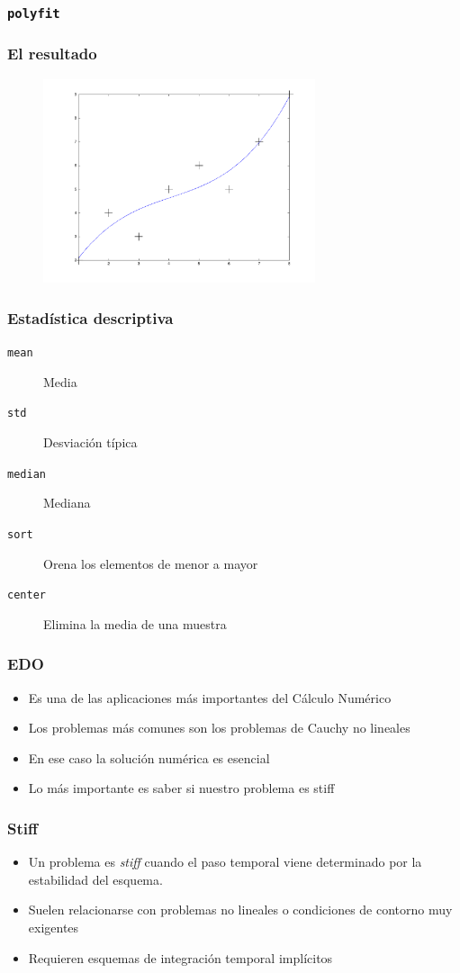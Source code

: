 \documentclass[12pt]{beamer}
\begin{document}
\begin{large}
\begin{frame}
\frametitle{\texttt{polyfit}}
\testcode
\end{frame}

\begin{frame}
\frametitle{El resultado}
  \begin{figure}[h]
    \centering{}
    \includegraphics[width=8cm, keepaspectratio]{fig/polyfit.pdf}
  \end{figure}
\end{frame}

\begin{frame}
\frametitle{Estadística descriptiva}
\begin{description}
\item[\texttt{mean}] Media
\item[\texttt{std}] Desviación típica
\item[\texttt{median}] Mediana
\item[\texttt{sort}] Orena los elementos de menor a mayor
\item[\texttt{center}] Elimina la media de una muestra
\end{description}
\end{frame}

\begin{frame}
\frametitle{EDO}
\begin{itemize}
\item Es una de las aplicaciones más importantes del Cálculo Numérico
\item Los problemas más comunes son los problemas de Cauchy no lineales
\item En ese caso la solución numérica es esencial
\item Lo más importante es saber si nuestro problema es stiff
\end{itemize}
\end{frame}

\begin{frame}
\frametitle{Stiff}
\begin{itemize}
\item Un problema es \emph{stiff} cuando el paso temporal viene
  determinado por la estabilidad del esquema.
\item Suelen relacionarse con problemas no lineales o condiciones de
  contorno muy exigentes
\item Requieren esquemas de integración temporal implícitos
\end{itemize}
\end{frame}


\end{large}
\end{document}
